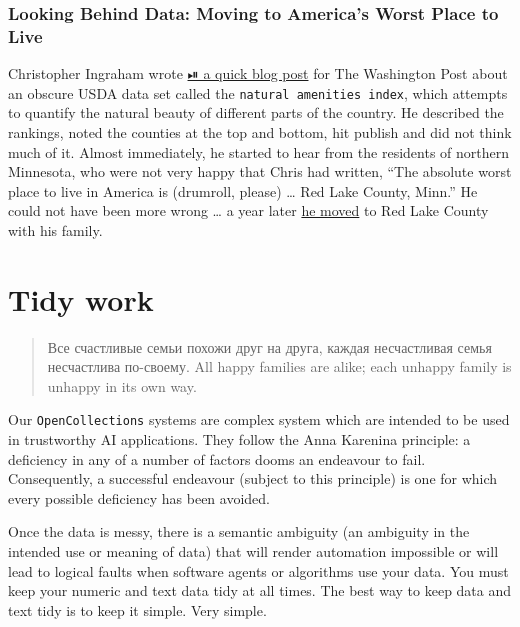 \documentclass[
  letterpaper,
  DIV=11,
  numbers=noendperiod]{scrreprt}
\begin{document}
\subsection{Looking Behind Data: Moving to America's Worst Place to
Live}\label{looking-behind-data-moving-to-americas-worst-place-to-live}

Christopher Ingraham wrote
\href{https://www.washingtonpost.com/gdpr-consent/?next_url=https\%3a\%2f\%2fwww.washingtonpost.com\%2fnews\%2fwonk\%2fwp\%2f2015\%2f08\%2f17\%2fevery-county-in-america-ranked-by-natural-beauty\%2f}{⏯
a quick blog post} for The Washington Post about an obscure USDA data
set called the \texttt{natural\ amenities\ index}, which attempts to
quantify the natural beauty of different parts of the country. He
described the rankings, noted the counties at the top and bottom, hit
publish and did not think much of it. Almost immediately, he started to
hear from the residents of northern Minnesota, who were not very happy
that Chris had written, ``The absolute worst place to live in America is
(drumroll, please) \ldots{} Red Lake County, Minn.'' He could not have
been more wrong \ldots{} a year later
\href{https://fivethirtyeight.com/features/he-called-it-americas-worst-place-to-live-now-hes-moving-there/}{he
moved} to Red Lake County with his family.


\chapter{Tidy work}\label{sec-tidy}

\begin{quote}
Все счастливые семьи похожи друг на друга, каждая несчастливая семья
несчастлива по-своему. All happy families are alike; each unhappy family
is unhappy in its own way.
\end{quote}

Our \texttt{OpenCollections} systems are complex system which are
intended to be used in trustworthy AI applications. They follow the Anna
Karenina principle: a deficiency in any of a number of factors dooms an
endeavour to fail. Consequently, a successful endeavour (subject to this
principle) is one for which every possible deficiency has been avoided.

Once the data is messy, there is a semantic ambiguity (an ambiguity in
the intended use or meaning of data) that will render automation
impossible or will lead to logical faults when software agents or
algorithms use your data. You must keep your numeric and text data tidy
at all times. The best way to keep data and text tidy is to keep it
simple. Very simple.
\end{document}
